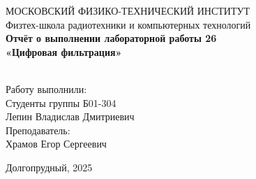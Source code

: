 \begin{center}
МОСКОВСКИЙ ФИЗИКО-ТЕХНИЧЕСКИЙ ИНСТИТУТ \\

\hfill \break
Физтех-школа радиотехники и компьютерных технологий\\
\vspace{5cm}
\large{\textbf{Отчёт о выполнении лабораторной работы 26  \\ «Цифровая фильтрация»}}\\
\hfill \break
\\
\end{center}

\vspace{5cm}
 
\begin{flushright}
Работу выполнили:\\
Студенты группы Б01-304\\
Лепин Владислав Дмитриевич\\
Преподаватель:\\
Храмов Егор Сергеевич\\
\end{flushright}
 
\vfill


\begin{center} Долгопрудный, 2025 \end{center}

\thispagestyle{empty}
\newpage